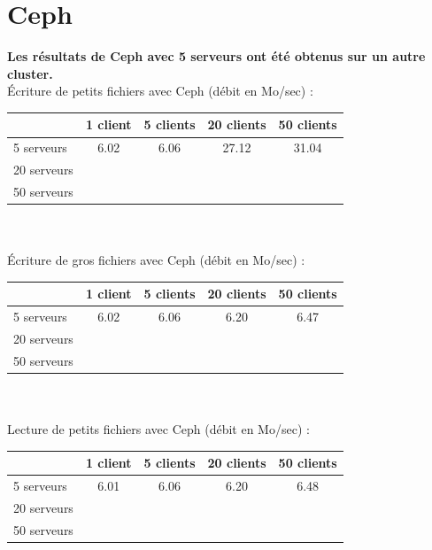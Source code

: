 \documentclass[12pt]{report}
\begin{document}
			\newpage

			\section{Ceph}

			\textbf{Les résultats de Ceph avec 5 serveurs ont été obtenus sur un autre cluster.}\\

			Écriture de petits fichiers avec Ceph (débit en Mo/sec) :

			\begin{tabular}{|l|c|c|c|c|}
				\hline
				& 1 client & 5 clients & 20 clients & 50 clients \\
				\hline
				5 serveurs & 6.02 & 6.06 & 27.12 & 31.04 \\
				\hline
				20 serveurs & & & & \\
				\hline
				50 serveurs & & & & \\
				\hline
			\end{tabular}\\\\

			Écriture de gros fichiers avec Ceph (débit en Mo/sec) :

			\begin{tabular}{|l|c|c|c|c|}
				\hline
				& 1 client & 5 clients & 20 clients & 50 clients \\
				\hline
				5 serveurs & 6.02 & 6.06 & 6.20 & 6.47 \\
				\hline
				20 serveurs & & & & \\
				\hline
				50 serveurs & & & & \\
				\hline
			\end{tabular}\\\\

			Lecture de petits fichiers avec Ceph (débit en Mo/sec) :

			\begin{tabular}{|l|c|c|c|c|}
				\hline
				& 1 client & 5 clients & 20 clients & 50 clients \\
				\hline
				5 serveurs & 6.01 & 6.06 & 6.20 & 6.48 \\
				\hline
				20 serveurs & & & & \\
				\hline
				50 serveurs & & & & \\
				\hline
			\end{tabular}\\\\
\end{document}
